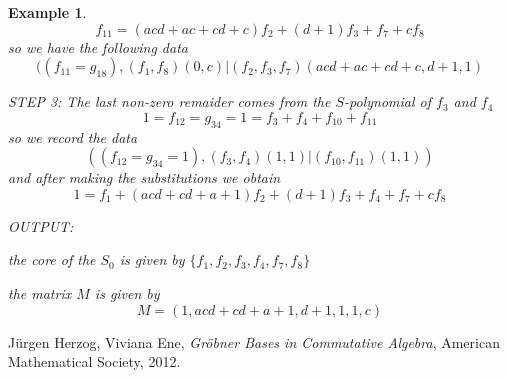 \documentclass{article}
\theoremstyle{plain}
\newtheorem{exemp}{Example}[defn]
\begin{document}
\begin{exemp}
$$f_{11}=(acd+ac+cd+c)f_2+(d+1)f_3+f_7+cf_8$$
so we have the following data
$$((f_{11}=g_{18}), (f_1,f_8)(0,c)|(f_2,f_3,f_7)(acd+ac+cd+c,d+1,1)$$ 

STEP 3:
The last non-zero remaider comes from the $S$-polynomial of $f_3$ and $f_4$
$$1=f_{12}=g_{34}=1=f_3+f_4+f_{10}+f_{11}$$
so we record the data 
$$((f_{12}=g_{34}=1), (f_3,f_4)(1,1)|(f_{10},f_{11})(1,1))$$
and after making the substitutions we obtain
$$1= f_1 + (acd + cd + a + 1)f_2 + (d+1)f_3 + f_4 + f_7 + c f_8$$

OUTPUT:

the core of the $S_0$ is given by  $\{f_1,f_2,f_3,f_4,f_7,f_8\}$ 
 
the matrix $M$ is given by $$M=(1,acd + cd + a + 1,d+1,1,1,c)$$

 
\end{exemp}				
\begin{thebibliography}{99}

  J\"urgen Herzog, Viviana Ene, \emph{Gr\"obner Bases in Commutative Algebra}, American Mathematical Society, 2012.
\end{thebibliography}
\end{document}
